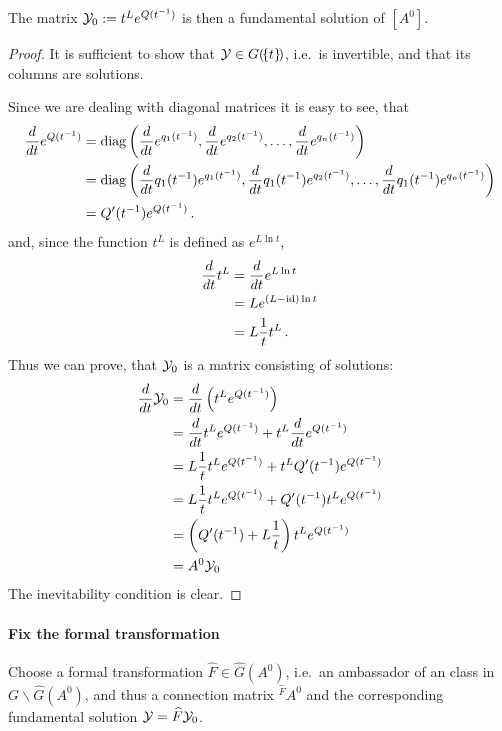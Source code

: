 \begin{lem}
  The matrix $\mathcal{Y}_0:=t^Le^{Q(t^{-1})}$ is then a fundamental solution of
  $[A^0]$.
\end{lem}
\begin{proof}
  It is sufficient to show that $\mathcal{Y}\in G(\!\{t\}\!)$, i.e.\ is invertible, and
  that its columns are solutions.

  Since we are dealing with diagonal matrices it is easy to see, that
  \begin{align*}
    \frac{d}{dt}e^{Q(t^{-1})}
    &=\operatorname{diag}\left(\frac{d}{dt}e^{q_1(t^{-1})},\frac{d}{dt}e^{q_2(t^{-1})},\dots,
      \frac{d}{dt}e^{q_n(t^{-1})}\right)
      \\&=\operatorname{diag}\left(\frac{d}{dt}q_1(t^{-1})e^{q_1(t^{-1})}
                    ,\frac{d}{dt}q_1(t^{-1})e^{q_2(t^{-1})}
                    ,\dots
                    ,\frac{d}{dt}q_1(t^{-1})e^{q_n(t^{-1})}\right)
  \\&=Q'(t^{-1})e^{Q(t^{-1})} \,.
  \end{align*}
  and, since the function $t^L$ is defined as $e^{L\ln t}$,
  \begin{align*}
    \frac{d}{dt}t^L&=\frac{d}{dt}e^{L\ln t}
  \\&=Le^{(L-\operatorname{id})\ln t}
  \\&=L\frac{1}{t}t^L \,.
  \end{align*}
  Thus we can prove, that $\mathcal{Y}_0$ is a matrix consisting of solutions:
  \begin{align*}
    \frac{d}{dt}\mathcal{Y}_0
    &=\frac{d}{dt}\left(t^Le^{Q(t^{-1})}\right)
  \\&=\frac{d}{dt}t^Le^{Q(t^{-1})}+t^L\frac{d}{dt}e^{Q(t^{-1})}
  \\&=L\frac{1}{t}t^Le^{Q(t^{-1})}+t^LQ'(t^{-1})e^{Q(t^{-1})}
  \\&=L\frac{1}{t}t^Le^{Q(t^{-1})}+Q'(t^{-1})t^Le^{Q(t^{-1})}
  \\&=\left(Q'(t^{-1})+L\frac{1}{t}\right)t^Le^{Q(t^{-1})}
  \\&=A^0\mathcal{Y}_0
  \end{align*}
  The inevitability condition is clear.
\end{proof}

\paragraph{Fix the formal transformation}
Choose a formal transformation $\hat F\in\hat G(A^0)$, i.e.\ an ambassador of
an class in $G\backslash\hat G(A^0)$, and thus a connection matrix
${}^{\hat F}\!A^0$ and the corresponding fundamental solution
$\mathcal{Y}=\widehat F\mathcal{Y}_0$.

